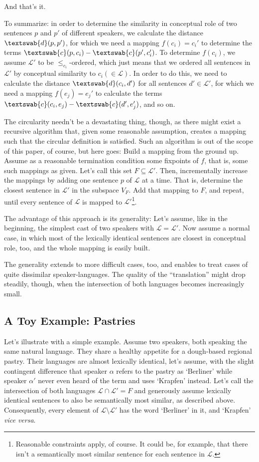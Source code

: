 \documentclass[11pt, a4paper]{scrartcl}
\renewcommand{\i}[1]{\emph{#1}}
\renewcommand{\L}{\mathcal{L}}
\newcommand{\m}[1]{\textswab{#1}}
\begin{document}
And that's it. 

To summarize: in order to determine the similarity in conceptual role of two sentences $p$ and $p'$ of different speakers, we calculate the distance $\m{d}(p,p')$, for which we need a mapping $f(c_i) = c_i'$ to determine the terms $\m{c}(p,c_i) - \m{c}(p',c_i')$. To determine $f(c_i)$, we assume $\L'$ to be $\leqslant_{c_i}$-ordered, which just means that we ordered all sentences in $\L'$ by conceptual similarity to $c_i (\in \L)$. In order to do this, we need to calculate the distance $\m{d}(c_i,d')$ for all sentences $d' \in \L'$, for which we need a mapping $f(e_j) = e_j'$ to calculate the terms $\m{c}(c_i,e_j) - \m{c}(d',e_j')$, and so on.

The circularity needn't be a devastating thing, though, as there might exist a recursive algorithm that, given some reasonable assumption, creates a mapping such that the circular definition is satisfied. Such an algorithm is out of the scope of this paper, of course, but here goes: Build a mapping from the ground up. Assume as a reasonable termination condition some fixpoints of $f$, that is, some such mappings as given. Let's call this set $F \subseteq \L'$. Then, incrementally increase the mappings by adding one sentence $p$ of $\L$ at a time. That is, determine the closest sentence in $\L'$ in the subspace $V_F$. Add that mapping to $F$, and repeat, until every sentence of $\L$ is mapped to $\L'$\footnote{Reasonable constraints apply, of course. It could be, for example, that there isn't a semantically most similar sentence for each sentence in $\L$.}.   

The advantage of this approach is its generality: Let's assume, like in the beginning, the simplest cast of two speakers with $\L = \L'$. Now assume a normal case, in which most of the lexically identical sentences are closest in conceptual role, too, and the whole mapping is easily built. 

The generality extends to more difficult cases, too, and enables to treat cases of quite dissimilar speaker-languages. The quality of the ``translation'' might drop steadily, though, when the intersection of both languages becomes increasingly small. 

\subsection{A Toy Example: Pastries}

Let's illustrate with a simple example. Assume two speakers, both speaking the same natural language. They share a healthy appetite for a dough-based regional pastry. Their languages are almost lexically identical, let's assume, with the slight contingent difference that speaker $\alpha$ refers to the pastry as `Berliner' while speaker $\alpha'$ never even heard of the term and uses `Krapfen' instead. Let's call the intersection of both languages $\L \cap \L' = F$ and generously assume lexically identical sentences to also be semantically most similar, as described above. Consequently, every element of $\L\setminus \L'$ has the word `Berliner' in it, and `Krapfen' \i{vice versa}.
\end{document}
